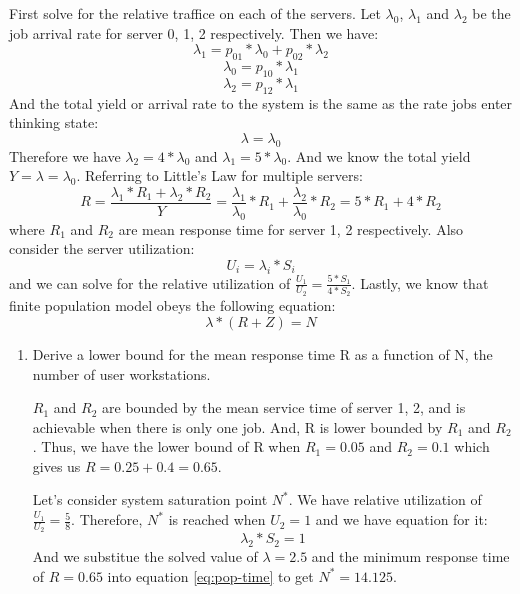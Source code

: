 \documentclass[12pt]{article}
\begin{document}
\begin{enumerate}
First solve for the relative traffice on each of the servers. Let $\lambda_0$, $\lambda_1$ and $\lambda_2$ be the job arrival rate for server 0, 1, 2 respectively. Then we have:
\begin{equation}
\lambda_1 = p_{01} * \lambda_0 + p_{02} * \lambda_2
\end{equation}
\begin{equation}
\lambda_0 =  p_{10} * \lambda_1
\end{equation}
\begin{equation}
\lambda_2 = p_{12} * \lambda_1
\end{equation}
And the total yield or arrival rate to the system is the same as the rate jobs enter thinking state:
\begin{equation}
\lambda = \lambda_0
\end{equation}
Therefore we have $\lambda_2 = 4 * \lambda_0$ and $\lambda_1 = 5 * \lambda_0$. And we know the total yield $Y = \lambda = \lambda_0$. Referring to Little's Law for multiple servers:
\begin{equation}
R = \frac{\lambda_1 * R_1 + \lambda_2 * R_2}{Y} = \frac{\lambda_1}{\lambda_0} * R_1 + \frac{\lambda_2}{\lambda_0} * R_2 = 5 * R_1 + 4 * R_2
\end{equation}
where $R_1$ and $R_2$ are mean response time for server 1, 2 respectively. Also consider the server utilization:
\begin{equation}
U_i = \lambda_i * S_i
\end{equation}
and we can solve for the relative utilization of $\frac{U_1}{U_2} = \frac{5 * S_1}{4 * S_2}$. Lastly, we know that finite population model obeys the following equation:
\begin{equation}\label{eq:pop-time}
\lambda * (R + Z) = N
\end{equation}

\begin{enumerate}
\item{} Derive a lower bound for the mean response time R as a function of N, the number of user workstations.

$R_1$ and $R_2$ are bounded by the mean service time of server 1, 2, and is achievable when there is only one job. And, R is lower bounded by $R_1$ and $R_2$. Thus, we have the lower bound of R when $R_1 = 0.05$ and $R_2 = 0.1$ which gives us $R = 0.25 + 0.4 = 0.65$.

Let's consider system saturation point $N^*$. We have relative utilization of $\frac{U_1}{U_2} = \frac{5}{8}$. Therefore, $N^*$ is reached when $U_2 = 1$ and we have equation for it:
\begin{equation}
\lambda_2 * S_2 = 1
\end{equation}
And we substitue the solved value of $\lambda = 2.5$ and the minimum response time of $R = 0.65$ into equation \ref{eq:pop-time} to get  $N^* = 14.125$.


\end{enumerate}
\end{enumerate}
\end{document}
